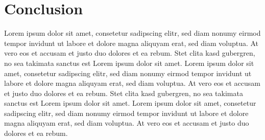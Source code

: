 \documentclass{vgtc}                          %
\begin{document}
\section{Conclusion}

Lorem ipsum dolor sit amet, consetetur sadipscing elitr, sed diam
nonumy eirmod tempor invidunt ut labore et dolore magna aliquyam erat,
sed diam voluptua. At vero eos et accusam et justo duo dolores et ea
rebum. Stet clita kasd gubergren, no sea takimata sanctus est Lorem
ipsum dolor sit amet. Lorem ipsum dolor sit amet, consetetur
sadipscing elitr, sed diam nonumy eirmod tempor invidunt ut labore et
dolore magna aliquyam erat, sed diam voluptua. At vero eos et accusam
et justo duo dolores et ea rebum. Stet clita kasd gubergren, no sea
takimata sanctus est Lorem ipsum dolor sit amet. Lorem ipsum dolor sit
amet, consetetur sadipscing elitr, sed diam nonumy eirmod tempor
invidunt ut labore et dolore magna aliquyam erat, sed diam
voluptua. At vero eos et accusam et justo duo dolores et ea
rebum.

%

%
%
%


\end{document}
